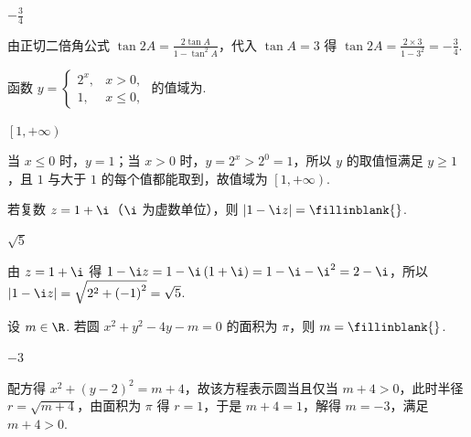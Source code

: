 \begin{answer}
\(-\frac34\)
\end{answer}

\begin{solution}
由正切二倍角公式 \(\tan 2A=\frac{2\tan A}{1-\tan^2 A}\)，代入 \(\tan A=3\) 得 \(\tan 2A=\frac{2\times 3}{1-3^2}=-\frac34\).
\end{solution}

\begin{problem}
函数 \(y=\begin{cases}
2^x,&x>0,\\
1,&x\le 0,
\end{cases}\) 的值域为\fillinblank{}.
\end{problem}

\begin{answer}
\(\left[1,+\infty\right)\)
\end{answer}

\begin{solution}
当 \(x\le 0\) 时，\(y=1\)；当 \(x>0\) 时，\(y=2^x>2^0=1\)，所以 \(y\) 的取值恒满足 \(y\ge 1\)，且 \(1\) 与大于 \(1\) 的每个值都能取到，故值域为 \(\left[1,+\infty\right)\).
\end{solution}

\begin{problem}
若复数 \(z=1+\i\)（\(\i\) 为虚数单位），则 \(\left|1-\i z\right|=\fillinblank{}\).
\end{problem}

\begin{answer}
\(\sqrt5\)
\end{answer}

\begin{solution}
由 \(z=1+\i\) 得 \(1-\i z=1-\i\left(1+\i\right)=1-\i-\i^2=2-\i\)，所以 \(\left|1-\i z\right|=\sqrt{2^2+\left(-1\right)^2}=\sqrt5\).
\end{solution}

\begin{problem}
设 \(m\in\R\). 若圆 \(x^2+y^2-4y-m=0\) 的面积为 \(\pi\)，则 \(m=\fillinblank{}\).
\end{problem}

\begin{answer}
\(-3\)
\end{answer}

\begin{solution}
配方得 \(x^2+\left(y-2\right)^2=m+4\)，故该方程表示圆当且仅当 \(m+4>0\)，此时半径 \(r=\sqrt{m+4}\)，由面积为 \(\pi\) 得 \(r=1\)，于是 \(m+4=1\)，解得 \(m=-3\)，满足 \(m+4>0\).
\end{solution}

